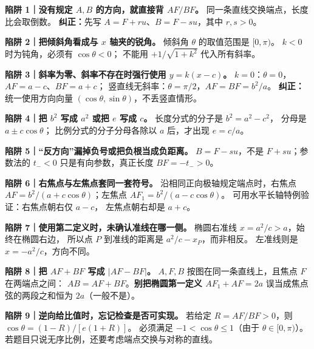 \begin{trapbox}
\textbf{陷阱 1｜没有规定 $A,B$ 的方向，就直接背 $AF/BF$。}
同一条直线交换端点，长度比会取倒数。
\textbf{纠正：}先写 $A=F+ru$、$B=F-su$，其中 $r,s>0$。
\par\smallskip\noindent
\textbf{陷阱 2｜把倾斜角看成与 $x$ 轴夹的锐角。}
倾斜角 $\theta$ 的取值范围是 $[0,\pi)$。
$k<0$ 时为钝角，必须有 $\cos\theta<0$；
不能用 $+1/\sqrt{1+k^2}$ 代入所有斜率。
\par\smallskip\noindent
\textbf{陷阱 3｜斜率为零、斜率不存在时强行使用 $y=k(x-c)$。}
$k=0$：$\theta=0$，$AF=a-c$、$BF=a+c$；
竖直线无斜率：$\theta=\pi/2$，$AF=BF=b^2/a$。
\textbf{纠正：}统一使用方向向量 $(\cos\theta,\sin\theta)$，不丢竖直情形。
\par\smallskip\noindent
\textbf{陷阱 4｜把 $b^2$ 写成 $a^2$ 或把 $e$ 写成 $c$。}
长度分式的分子是 $b^2=a^2-c^2$，
分母是 $a\pm c\cos\theta$；
比例分式的分子分母各除以 $a$ 后，才出现 $e=c/a$。
\par\smallskip\noindent
\textbf{陷阱 5｜``反方向''漏掉负号或把负根当成负距离。}
$B=F-su$，不是 $F+su$；参数法的 $t_-<0$
只是有向参数，真正长度 $BF=-t_->0$。
\par\smallskip\noindent
\textbf{陷阱 6｜右焦点与左焦点套同一套符号。}
沿相同正向极轴规定端点时，右焦点
$AF=b^2/(a+c\cos\theta)$；左焦点
$AF_1=b^2/(a-c\cos\theta)$。
可用水平长轴特例验证：右焦点朝右仅 $a-c$，
左焦点朝右却是 $a+c$。
\par\smallskip\noindent
\textbf{陷阱 7｜使用第二定义时，未确认准线在哪一侧。}
椭圆右准线 $x=a^2/c>a$，始终在椭圆右边，
所以点 $P$ 到准线的距离是 $a^2/c-x_P$，而非相反。
左准线则是 $x=-a^2/c$，方向不同。
\par\smallskip\noindent
\textbf{陷阱 8｜把 $AF+BF$ 写成 $|AF-BF|$。}
$A,F,B$ 按图在同一条直线上，且焦点 $F$ 在两端点之间：
$AB=AF+BF$。\textbf{别把椭圆第一定义 $AF_1+AF=2a$}
误当成焦点弦的两段之和恒为 $2a$（一般不是）。
\par\smallskip\noindent
\textbf{陷阱 9｜逆向给比值时，忘记检查是否可实现。}
若给定 $R=AF/BF>0$，则
$\cos\theta=(1-R)/[e(1+R)]$。
必须满足 $-1<\cos\theta\le1$（由于 $\theta\in[0,\pi)$）。
若题目只说无序比例，还要考虑端点交换与对称的直线。
\end{trapbox}
